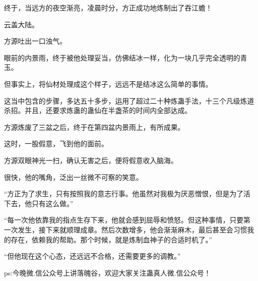\begin{this_body}
终于，当远方的夜空渐亮，凌晨时分，方正成功地炼制出了吞江蟾！

云盖大陆。

方源吐出一口浊气。

眼前的内景雨，终于被他处理妥当，仿佛结冰一样，化为一块几乎完全透明的青玉。

但事实上，将仙材处理成这个样子，远远不是结冰这么简单的事情。

这当中包含的步骤，多达五十多步，运用了超过二十种炼蛊手法，十三个凡级炼道杀招。并且，还要求炼蛊的蛊仙在半盏茶的时间内全部达成。

方源炼废了三盆之后，终于在第四盆内景雨上，有所成果。

这时，一股假意，飞到他的面前。

方源双眼神光一扫，确认无害之后，便将假意收入脑海。

很快，他的嘴角，泛出一丝微不可察的笑意。

“方正为了求生，只有按照我的意志行事。他虽然对我极为厌恶憎恨，但是为了活下去，他只有这么做。”

“每一次他依靠我的指点生存下来，他就会感到屈辱和愤怒。但这种事情，只要第一次发生，接下来就顺理成章。然后次数增多，他会渐渐麻木，最后甚至会习惯我的存在，依赖我的帮助。那个时候，就是炼制血神子的合适时机了。”

“但他现在这个心态，还远远不合格，还需要更多的调教。”

ps:今晚微.信公众号上讲落魄谷，欢迎大家关注蛊真人微.信公众号！

\end{this_body}

